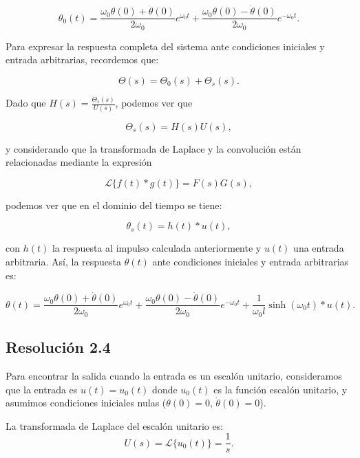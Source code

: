 \documentclass[
  11pt,
  letterpaper,
   addpoints,
   answers
  ]{exam}
\begin{document}
\begin{questions}
\begin{solution}
\begin{equation}
\theta_0(t) = \frac{\omega_0\theta(0) + \dot{\theta}(0)}{2\omega_0} e^{\omega_0 t} + \frac{\omega_0\theta(0) - \dot{\theta}(0)}{2\omega_0} e^{-\omega_0 t}.
\end{equation}

Para expresar la respuesta completa del sistema ante condiciones iniciales y entrada arbitrarias, recordemos que:

\begin{equation}
\Theta(s) = \Theta_0(s) + \Theta_s(s).
\end{equation}

Dado que \(H(s) = \frac{\Theta_s(s)}{U(s)}\), podemos ver que

\begin{equation}
\Theta_s(s) = H(s) U(s),
\end{equation}

y considerando que la transformada de Laplace y la convolución están relacionadas mediante la expresión

\begin{equation}
\mathcal{L}\{f(t) \ast g(t)\} = F(s) G(s),
\end{equation}

podemos ver que en el dominio del tiempo se tiene:

\begin{equation}
\theta_s(t) = h(t) \ast u(t),
\end{equation}

con \(h(t)\) la respuesta al impulso calculada anteriormente y \(u(t)\) una entrada arbitraria. Así, la respuesta \(\theta(t)\) ante condiciones iniciales y entrada arbitrarias es:

\begin{equation}
\theta(t) = \frac{\omega_0\theta(0) + \dot{\theta}(0)}{2\omega_0} e^{\omega_0 t} + \frac{\omega_0\theta(0) - \dot{\theta}(0)}{2\omega_0} e^{-\omega_0 t} + \frac{1}{\omega_0 l} \sinh(\omega_0 t) \ast u(t).
\end{equation}
\subsection*{Resolución 2.4}
Para encontrar la salida cuando la entrada es un escalón unitario, consideramos que la entrada es \(u(t) = u_0(t)\) donde \(u_0(t)\) es la función escalón unitario, y asumimos condiciones iniciales nulas (\(\theta(0) = 0\), \(\dot{\theta}(0) = 0\)).

La transformada de Laplace del escalón unitario es:
\begin{equation}
U(s) = \mathcal{L}\{u_0(t)\} = \frac{1}{s}.
\end{equation}


\end{solution}
\end{questions}
\end{document}
